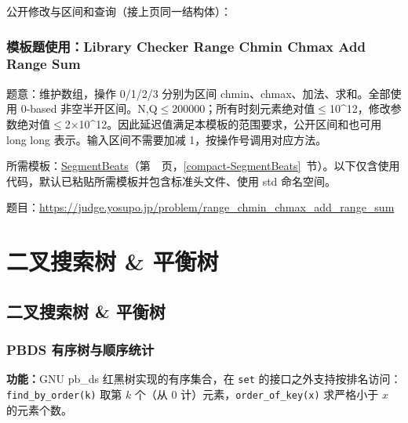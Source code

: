 

\newpage

\noindent 公开修改与区间和查询（接上页同一结构体）：



\Needspace{481pt}

\subsection*{模板题使用：Library Checker Range Chmin Chmax Add Range Sum}

\label{usage-example-200}

题意：维护数组，操作 0/1/2/3 分别为区间 chmin、chmax、加法、求和。全部使用 0-based 非空半开区间。N,Q$\le$200000；所有时刻元素绝对值$\le$10\textasciicircum{}12，修改参数绝对值$\le$2×10\textasciicircum{}12。因此延迟值满足本模板的范围要求，公开区间和也可用 long long 表示。输入区间不需要加减 1，按操作号调用对应方法。

所需模板：\hyperref[compact-SegmentBeats]{SegmentBeats}（第~\pageref{compact-SegmentBeats}~页，\ref{compact-SegmentBeats}~节）。以下仅含使用代码，默认已粘贴所需模板并包含标准头文件、使用 std 命名空间。

题目：\url{https://judge.yosupo.jp/problem/range_chmin_chmax_add_range_sum}



\newpage

\Needspace{391pt}

\chapter{二叉搜索树 \& 平衡树}

\section{二叉搜索树 \& 平衡树}

\subsection{PBDS 有序树与顺序统计}\label{compact-ost}

\noindent\textbf{功能：}\allowbreak GNU pb\_ds 红黑树实现的有序集合，在 \texttt{set} 的接口之外支持按排名访问：\texttt{find\_by\_order(k)} 取第 $k$ 个（从 0 计）元素，\texttt{order\_of\_key(x)} 求严格小于 $x$ 的元素个数。

